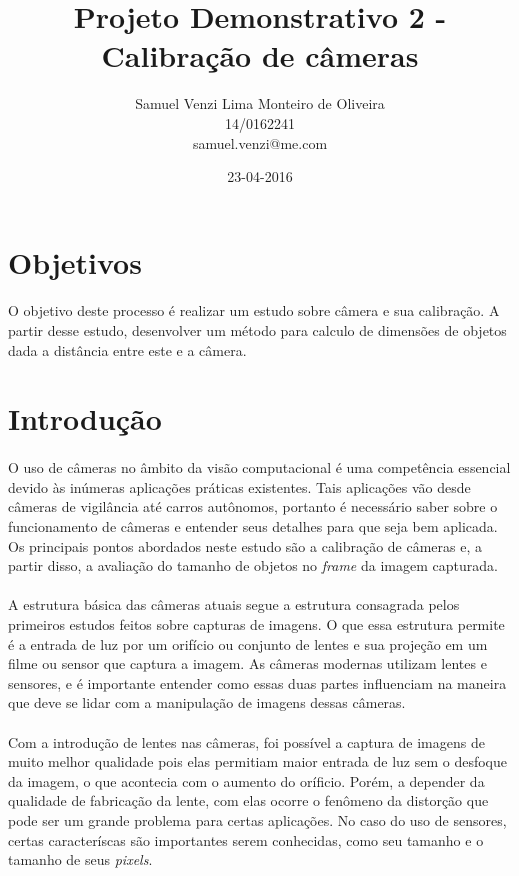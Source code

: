 \documentclass{article}
\begin{document}
\title{Projeto Demonstrativo 2 - Calibração de câmeras}
\date{23-04-2016}
\author{Samuel Venzi Lima Monteiro de Oliveira\\14/0162241\\samuel.venzi@me.com}

	\maketitle

	\section{Objetivos}
		\paragraph{}
		O objetivo deste processo é realizar um estudo sobre câmera e sua calibração. A partir desse estudo, desenvolver um método para calculo de dimensões de objetos dada a distância entre este e a câmera.
	\section{Introdução}
		\paragraph{}
		O uso de câmeras no âmbito da visão computacional é uma competência essencial devido às inúmeras aplicações práticas existentes. Tais aplicações vão desde câmeras de vigilância até carros autônomos, portanto é necessário saber sobre o funcionamento de câmeras e entender seus detalhes para que seja bem aplicada. Os principais pontos abordados neste estudo são a calibração de câmeras e, a partir disso, a avaliação do tamanho de objetos no \textit{frame} da imagem capturada.
		\paragraph{}
		A estrutura básica das câmeras atuais segue a estrutura consagrada pelos primeiros estudos feitos sobre capturas de imagens. O que essa estrutura permite é a entrada de luz por um orifício ou conjunto de lentes e sua projeção em um filme ou sensor que captura a imagem. As câmeras modernas utilizam lentes e sensores, e é importante entender como essas duas partes influenciam na maneira que deve se lidar com a manipulação de imagens dessas câmeras.
		\paragraph{}
		Com a introdução de lentes nas câmeras, foi possível a captura de imagens de muito melhor qualidade pois elas permitiam maior entrada de luz sem o desfoque da imagem, o que acontecia com o aumento do oríficio. Porém, a depender da qualidade de fabricação da lente, com elas ocorre o fenômeno da distorção que pode ser um grande problema para certas aplicações. No caso do uso de sensores, certas caracteríscas são importantes serem conhecidas, como seu tamanho e o tamanho de seus \textit{pixels}.
\end{document}
